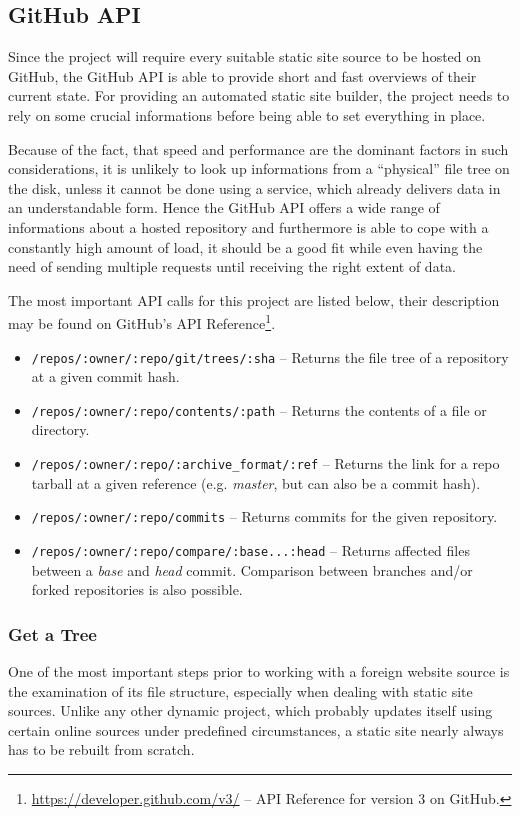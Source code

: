 \subsection{GitHub API}
\label{sec:foundation-github}

Since the project will require every suitable static site source to be hosted on GitHub, the GitHub API is able to provide short and fast overviews of their current state. For providing an automated static site builder, the project needs to rely on some crucial informations before being able to set everything in place.

Because of the fact, that speed and performance are the dominant factors in such considerations, it is unlikely to look up informations from a ``physical'' file tree on the disk, unless it cannot be done using a service, which already delivers data in an understandable form. Hence the GitHub API offers a wide range of informations about a hosted repository and furthermore is able to cope with a constantly high amount of load, it should be a good fit while even having the need of sending multiple requests until receiving the right extent of data.

The most important API calls for this project are listed below, their description may be found on GitHub's API Reference\footnote{\url{https://developer.github.com/v3/} -- API Reference for version 3 on GitHub.}.

\begin{itemize}
  \item \texttt{/repos/:owner/:repo/git/trees/:sha} -- Returns the file tree of a repository at a given commit hash.
  \item \texttt{/repos/:owner/:repo/contents/:path} -- Returns the contents of a file or directory. %
  \item \texttt{/repos/:owner/:repo/:archive\_format/:ref} -- Returns the link for a repo tarball at a given reference (e.g. \emph{master}, but can also be a commit hash).
  \item \texttt{/repos/:owner/:repo/commits} -- Returns commits for the given repository.
  \item \texttt{/repos/:owner/:repo/compare/:base...:head} -- Returns affected files between a \emph{base} and \emph{head} commit. Comparison between branches and/or forked repositories is also possible.
\end{itemize}

\subsubsection{Get a Tree}
One of the most important steps prior to working with a foreign website source is the examination of its file structure, especially when dealing with static site sources. Unlike any other dynamic project, which probably updates itself using certain online sources under predefined circumstances, a static site nearly always has to be rebuilt from scratch.

